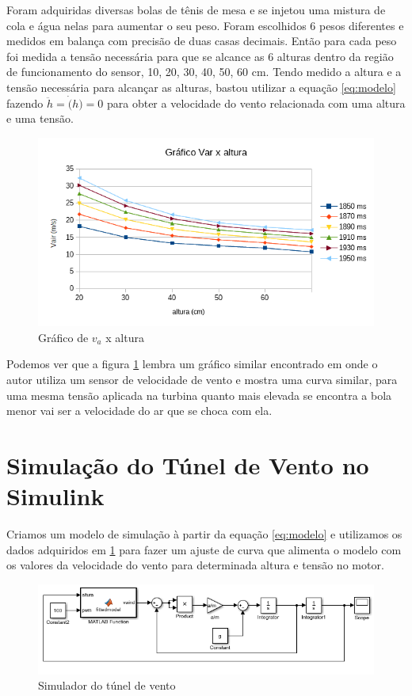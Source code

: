 Foram adquiridas diversas bolas de tênis de mesa e se injetou uma mistura de cola e água nelas para aumentar o seu peso. Foram escolhidos 6 pesos diferentes e medidos em balança com precisão de duas casas decimais. Então para cada peso foi medida a tensão necessária para que se alcance as 6 alturas dentro da região de funcionamento do sensor, 10, 20, 30, 40, 50, 60 cm. Tendo medido a altura e a tensão necessária para alcançar as alturas, bastou utilizar a equação \ref{eq:modelo} fazendo $\ddot{h}=\dot(h)=0$ para obter a velocidade do vento relacionada com uma altura e uma tensão.

\begin{figure}[h]
	\centering
	\includegraphics{grafico_vair_altura}
	\caption[Gráfico $v_a$ x altura]{Gráfico de $v_a$ x altura}
	\label{fig:graficovairaltura1}
\end{figure}

Podemos ver que a figura \ref{fig:graficovairaltura1} lembra um gráfico similar encontrado em \cite{jernigan2009} onde o autor utiliza um sensor de velocidade de vento e mostra uma curva similar, para uma mesma tensão aplicada na turbina quanto mais elevada se encontra a bola menor vai ser a velocidade do ar que se choca com ela.

\section{Simulação do Túnel de Vento no Simulink}

Criamos um modelo de simulação à partir da equação \ref{eq:modelo} e utilizamos os dados adquiridos em \ref{fig:graficovairaltura1} para fazer um ajuste de curva que alimenta o modelo com os valores da velocidade do vento para determinada altura e tensão no motor.

\begin{figure}[h]
	\centering
	\includegraphics{simulador}
	\caption[Simulador do túnel de vento]{Simulador do túnel de vento}
	\label{fig:simulador}
\end{figure}




